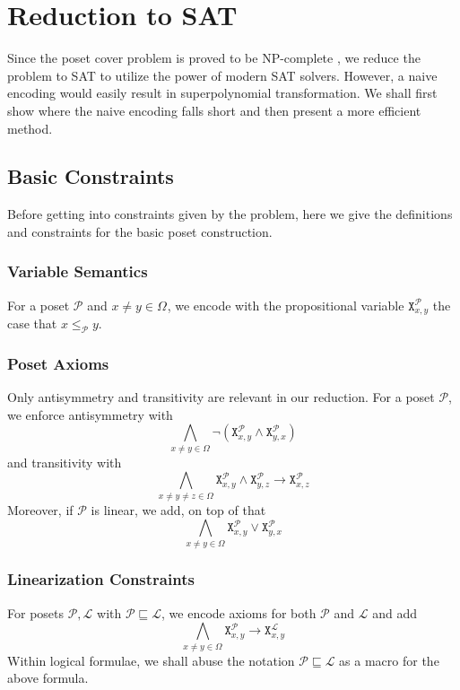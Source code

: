 \documentclass{llncs}
\let\oldleq\leq
\renewcommand{\leq}[1][]{\oldleq_{#1}}
\renewcommand{\implies}{\rightarrow}
\newcommand{\poset}[1]{\mathcal{#1}}
\newcommand{\uni}[1][]{\Omega_{#1}}
\newcommand{\lext}{\sqsubseteq}
\newcommand{\satvar}[2]{\mathtt{X}_{#1}^{#2}}
\begin{document}
\section{Reduction to SAT}
Since the poset cover problem is proved to be NP-complete \cite{heath2013poset}, we reduce the problem to SAT to utilize the power of modern SAT solvers. However, a naive encoding would easily result in superpolynomial transformation. We shall first show where the naive encoding falls short and then present a more efficient method.

\subsection{Basic Constraints}
Before getting into constraints given by the problem, here we give the definitions and constraints for the basic poset construction.

\subsubsection{Variable Semantics}
For a poset $\poset{P}$ and $x \!\neq\! y \!\in\! \uni$, we encode with the propositional variable $\satvar{x,y}{\poset{P}}$ the case that $x \leq[\poset{P}] y$.

\subsubsection{Poset Axioms}
Only antisymmetry and transitivity are relevant in our reduction. For a poset $\poset{P}$, we enforce antisymmetry with
\[
\bigwedge_{x \neq y \in \uni} \neg (\satvar{x,y}{\poset{P}} \wedge \satvar{y,x}{\poset{P}})
\]
and transitivity with
\[
\bigwedge_{x \neq y \neq z \in \uni}
\satvar{x,y}{\poset{P}} \wedge \satvar{y,z}{\poset{P}} \implies \satvar{x,z}{\poset{P}}
\]
Moreover, if $\poset{P}$ is linear, we add, on top of that
\[
\bigwedge_{x \neq y \in \uni} \satvar{x,y}{\poset{P}} \vee \satvar{y,x}{\poset{P}}
\]

\subsubsection{Linearization Constraints}
For posets $\poset{P},\poset{L}$ with $\poset{P} \lext \poset{L}$, we encode axioms for both $\poset{P}$ and $\poset{L}$ and add
\[
\bigwedge_{x \neq y \in \uni} \satvar{x,y}{\poset{P}} \implies \satvar{x,y}{\poset{L}}
\]
Within logical formulae, we shall abuse the notation $\poset{P} \lext \poset{L}$ as a macro for the above formula.
\label{subsubsec:linear}
\end{document}
